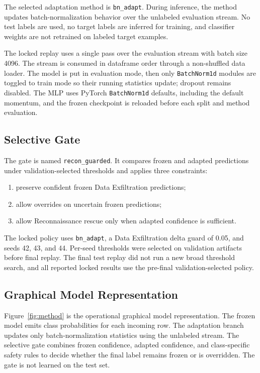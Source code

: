 \documentclass[10pt]{article}
\begin{document}
The selected adaptation method is \texttt{bn\_adapt}.
During inference, the method updates batch-normalization behavior over the unlabeled evaluation stream.
No test labels are used, no target labels are inferred for training, and classifier weights are not retrained on labeled target examples.

The locked replay uses a single pass over the evaluation stream with batch size 4096.
The stream is consumed in dataframe order through a non-shuffled data loader.
The model is put in evaluation mode, then only \texttt{BatchNorm1d} modules are toggled to train mode so their running statistics update; dropout remains disabled.
The MLP uses PyTorch \texttt{BatchNorm1d} defaults, including the default momentum, and the frozen checkpoint is reloaded before each split and method evaluation.

\subsection{Selective Gate}

The gate is named \texttt{recon\_guarded}.
It compares frozen and adapted predictions under validation-selected thresholds and applies three constraints:
\begin{enumerate}[leftmargin=*]
  \item preserve confident frozen Data Exfiltration predictions;
  \item allow overrides on uncertain frozen predictions;
  \item allow Reconnaissance rescue only when adapted confidence is sufficient.
\end{enumerate}

The locked policy uses \texttt{bn\_adapt}, a Data Exfiltration delta guard of 0.05, and seeds 42, 43, and 44.
Per-seed thresholds were selected on validation artifacts before final replay.
The final test replay did not run a new broad threshold search, and all reported locked results use the pre-final validation-selected policy.

\subsection{Graphical Model Representation}

Figure~\ref{fig:method} is the operational graphical model representation.
The frozen model emits class probabilities for each incoming row.
The adaptation branch updates only batch-normalization statistics using the unlabeled stream.
The selective gate combines frozen confidence, adapted confidence, and class-specific safety rules to decide whether the final label remains frozen or is overridden.
The gate is not learned on the test set.
\end{document}
